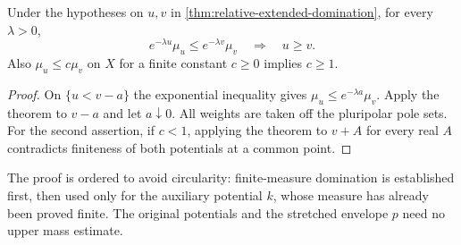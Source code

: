 \begin{corollary}\label{cor:relative-extended-exponential-order}
Under the hypotheses on $u,v$ in \cref{thm:relative-extended-domination}, for every $\lambda>0$,
\[
 e^{-\lambda u}\mu_u\leq e^{-\lambda v}\mu_v
 \quad\Longrightarrow\quad u\geq v.
\]
Also $\mu_u\leq c\mu_v$ on $X$ for a finite constant $c\geq0$ implies $c\geq1$.
\end{corollary}
\begin{proof}
On $\{u<v-a\}$ the exponential inequality gives $\mu_u\leq e^{-\lambda a}\mu_v$. Apply the theorem to $v-a$ and let $a\downarrow0$. All weights are taken off the pluripolar pole sets. For the second assertion, if $c<1$, applying the theorem to $v+A$ for every real $A$ contradicts finiteness of both potentials at a common point.
\end{proof}

The proof is ordered to avoid circularity: finite-measure domination is established first, then used only for the auxiliary potential $k$, whose measure has already been proved finite. The original potentials and the stretched envelope $p$ need no upper mass estimate.
